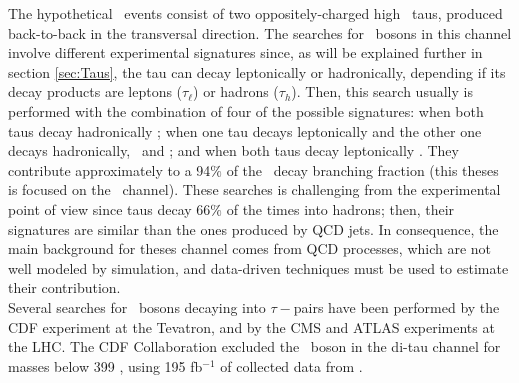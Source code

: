 \begin{itemize}
\noindent The hypothetical \Zprimetotautau~events consist of 
two oppositely-charged high \pt~taus, produced back-to-back in the transversal 
direction. The searches for \Zprime~bosons in this channel involve different experimental 
signatures since, as will be explained further in section \ref{sec:Taus}, the tau can decay leptonically or 
hadronically, depending if its decay products are leptons ($\tau_{\ell}$) or 
hadrons ($\tau_{h}$). Then, this search usually is performed with the combination of four 
of the possible signatures: when both taus decay hadronically \Zprimetotauh; when one tau decays 
leptonically and the other one decays hadronically,
\Zprimetotaue~and \Zprimetotaumu; and when both taus decay leptonically \Zprimetoemu. They contribute 
approximately to a 94$\%$ of the \Zprime~decay branching fraction (this theses is focused on 
the \Zprimetotauh~channel). These searches is challenging from the experimental point 
of view since taus decay 66$\%$ of the times into hadrons; then, their signatures are 
similar than the ones produced by QCD jets. In consequence, the main background for theses 
channel comes from QCD processes, which are not well modeled by simulation, and data-driven 
techniques must be used to estimate their contribution. \\




\noindent Several searches for \Zprime~bosons decaying into  $\tau-$pairs have 
been performed by the CDF \cite{CDFZprimeditaubib} experiment at the Tevatron, and by the 
CMS \cite{CMSZprimetotautaurun1, CMSZprimetotautauemu, CMSZprimetotautau2015} and 
ATLAS \cite{ATLASZprimetotautau2016, ATLASZprimetotautau2015, ATLASZprimetotautaurun1, ATLASZprimetotautau2011} experiments 
at the LHC. The CDF Collaboration excluded the \ZprimeSSM~boson in the di-tau channel
for masses below 399 \GeV, using 195 fb$^{-1}$ of collected data from \cite{CDFZprimeditaubib}. \\


\end{itemize}
